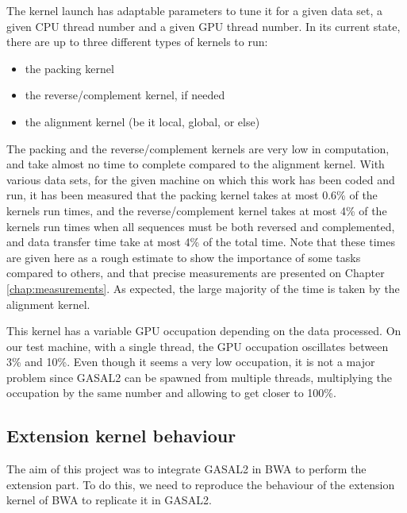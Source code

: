 The kernel launch has adaptable parameters to tune it for a given data set, a given CPU thread number and a given GPU thread number. In its current state, there are up to three different types of kernels to run:

\begin{itemize}
	\item the packing kernel
	\item the reverse/complement kernel, if needed
	\item the alignment kernel (be it local, global, or else)
\end{itemize}

The packing and the reverse/complement kernels are very low in computation, and take almost no time to complete compared to the alignment kernel. With various data sets, for the given machine on which this work has been coded and run, it has been measured that the packing kernel takes at most 0.6\% of the kernels run times, and the reverse/complement kernel takes at most 4\% of the kernels run times when all sequences must be both reversed and complemented, and data transfer time take at most 4\% of the total time. Note that these times are given here as a rough estimate to show the importance of some tasks compared to others, and that precise measurements are presented on Chapter \ref{chap:measurements}. As expected, the large majority of the time is taken by the alignment kernel.

This kernel has a variable GPU occupation depending on the data processed. On our test machine, with a single thread, the GPU occupation oscillates between 3\% and 10\%. Even though it seems a very low occupation, it is not a major problem since GASAL2 can be spawned from multiple threads, multiplying the occupation by the same number and allowing to get closer to 100\%.


\subsection{Extension kernel behaviour}
\label{sec:seedonly}
The aim of this project was to integrate GASAL2 in BWA to perform the extension part. To do this, we need to reproduce the behaviour of the extension kernel of BWA to replicate it in GASAL2.

